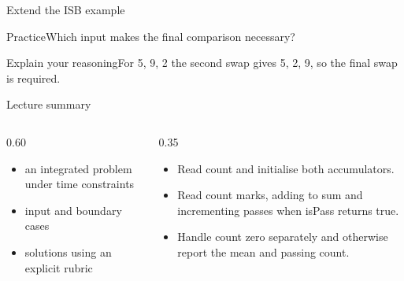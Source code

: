 \documentclass[10pt,aspectratio=169]{beamer}
\begin{document}
\begin{frame}[fragile,t]{Extend the ISB example}
\begin{alertblock}{Practice}Which input makes the final comparison necessary?\end{alertblock}\vspace{3mm}\begin{exampleblock}{Explain your reasoning}For 5, 9, 2 the second swap gives 5, 2, 9, so the final swap is required.\end{exampleblock}
\end{frame}
\begin{frame}[fragile,t]{Lecture summary}
\begin{columns}[T,onlytextwidth]\begin{column}{0.60\textwidth}
\begin{itemize}
\item an integrated problem under time constraints
\item input and boundary cases
\item solutions using an explicit rubric
\end{itemize}
\end{column}\begin{column}{0.35\textwidth}\small
\begin{itemize}
\item Read count and initialise both accumulators.
\item Read count marks, adding to sum and incrementing passes when isPass returns true.
\item Handle count zero separately and otherwise report the mean and passing count.
\end{itemize}
\end{column}\end{columns}
\end{frame}
\end{document}
